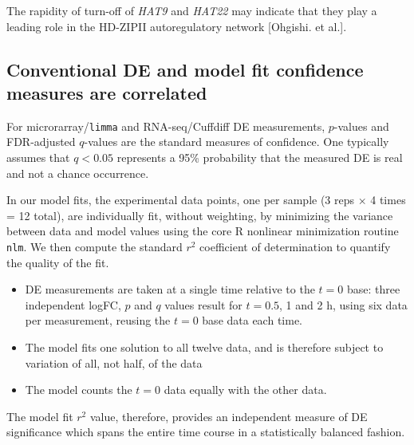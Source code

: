 \documentclass[aspb,landscape]{a0poster}
\begin{document}
\begin{multicols}{3}
  The rapidity of turn-off of \textit{HAT9} and \textit{HAT22} may indicate that they play a leading role in the HD-ZIPII autoregulatory network [Ohgishi. et al.].

  \subsection*{Conventional DE and model fit confidence measures are correlated}

  For microrarray/\texttt{limma} and RNA-seq/Cuffdiff DE measurements, $p$-values and FDR-adjusted $q$-values are the standard measures of confidence.
  One typically assumes that $q<0.05$ represents a 95\% probability that the measured DE is real and not a chance occurrence.
  
  In our model fits, the experimental data points, one per sample (3 reps $\times$ 4 times = 12 total),
  are individually fit, without weighting, by minimizing the variance between data and model values using the core R nonlinear minimization routine \texttt{nlm}. We then compute the standard $r^2$ coefficient
  of determination to quantify the quality of the fit.
  \begin{itemize}
  \item DE measurements are taken at a single time relative to the $t=0$ base: three independent logFC, $p$ and $q$ values result for $t=0.5$, 1 and 2 h, using six data per measurement, reusing the $t=0$ base data each time.
  \item The model fits one solution to all twelve data, and is therefore subject to variation of all, not half, of the data
  \item The model counts the $t=0$ data equally with the other data.
  \end{itemize}
  The model fit $r^2$ value, therefore, provides an independent measure of DE significance which spans the entire time course in a statistically balanced fashion.


\end{multicols}
\end{document}
